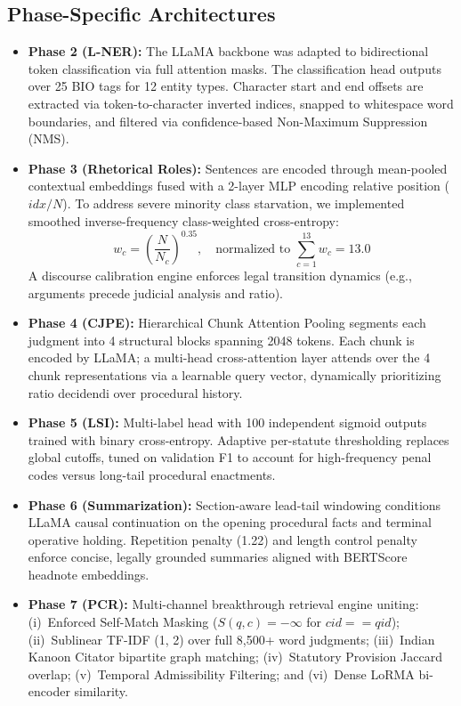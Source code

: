 \documentclass[11pt, oneside]{article}
\begin{document}
\subsection{Phase-Specific Architectures}
\begin{itemize}
    \item \textbf{Phase 2 (L-NER):} The LLaMA backbone was adapted to bidirectional token classification via full attention masks. The classification head outputs over 25 BIO tags for 12 entity types. Character start and end offsets are extracted via token-to-character inverted indices, snapped to whitespace word boundaries, and filtered via confidence-based Non-Maximum Suppression (NMS).
    \item \textbf{Phase 3 (Rhetorical Roles):} Sentences are encoded through mean-pooled contextual embeddings fused with a 2-layer MLP encoding relative position ($idx / N$). To address severe minority class starvation, we implemented smoothed inverse-frequency class-weighted cross-entropy:
    $$w_c = \left(\frac{N}{N_c}\right)^{0.35}, \quad \text{normalized to } \sum_{c=1}^{13} w_c = 13.0$$
    A discourse calibration engine enforces legal transition dynamics (e.g., arguments precede judicial analysis and ratio).
    \item \textbf{Phase 4 (CJPE):} Hierarchical Chunk Attention Pooling segments each judgment into 4 structural blocks spanning 2048 tokens. Each chunk is encoded by LLaMA; a multi-head cross-attention layer attends over the 4 chunk representations via a learnable query vector, dynamically prioritizing ratio decidendi over procedural history.
    \item \textbf{Phase 5 (LSI):} Multi-label head with 100 independent sigmoid outputs trained with binary cross-entropy. Adaptive per-statute thresholding replaces global cutoffs, tuned on validation F1 to account for high-frequency penal codes versus long-tail procedural enactments.
    \item \textbf{Phase 6 (Summarization):} Section-aware lead-tail windowing conditions LLaMA causal continuation on the opening procedural facts and terminal operative holding. Repetition penalty (1.22) and length control penalty enforce concise, legally grounded summaries aligned with BERTScore headnote embeddings.
    \item \textbf{Phase 7 (PCR):} Multi-channel breakthrough retrieval engine uniting: (i)~Enforced Self-Match Masking ($S(q, c) = -\infty$ for $cid == qid$); (ii)~Sublinear TF-IDF (1, 2) over full 8,500+ word judgments; (iii)~Indian Kanoon Citator bipartite graph matching; (iv)~Statutory Provision Jaccard overlap; (v)~Temporal Admissibility Filtering; and (vi)~Dense LoRMA bi-encoder similarity.
\end{itemize}
\end{document}
